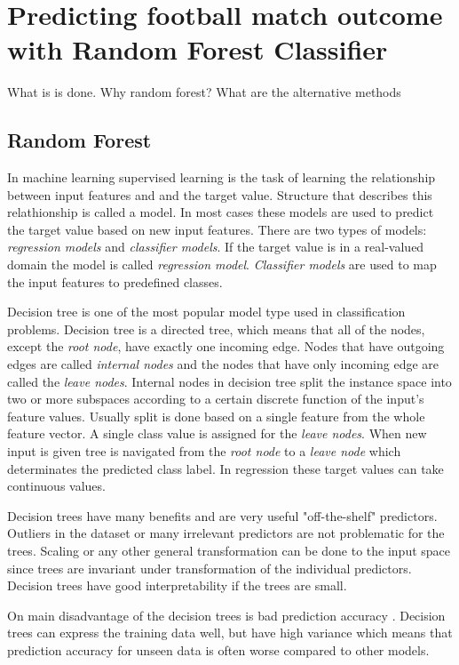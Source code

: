 \section{Predicting football match outcome with Random Forest Classifier}
What is is done. Why random forest? What are the alternative methods
\subsection{Random Forest}
In machine learning supervised learning is the task of learning the relationship between input features and and the target value. Structure that describes this relathionship is called a model. In most cases these models are used to predict the target value based on new input features. There are two types of models: \textit{regression models} and \textit{classifier models}. If the target value is in a real-valued domain the model is called \textit{regression model}. \textit{Classifier models} are used to map the input features to predefined classes. \cite{rokach2005top}

Decision tree is one of the most popular model type used in classification problems. Decision tree is a directed tree, which means that all of the nodes, except the \textit{root node}, have exactly one incoming edge. Nodes that have outgoing edges are called \textit{internal nodes} and the nodes that have only incoming edge are called the \textit{leave nodes}. Internal nodes in decision tree split the instance space into two or more subspaces according to a certain discrete function of the input's feature values. Usually split is done based on a single feature from the whole feature vector. A single class value is assigned for the \textit{leave nodes}. When new input is given tree is navigated from the \textit{root node} to a \textit{leave node} which determinates the predicted class label. In regression these target values can take continuous values. \cite{rokach2005top}

Decision trees have many benefits and are very useful "off-the-shelf" predictors. Outliers in the dataset or many irrelevant predictors are not problematic for the trees. Scaling or any other general transformation can be done to the input space since trees are invariant under transformation of the individual predictors. \cite{friedman2001elements} Decision trees have good interpretability if the trees are small.

On main disadvantage of the decision trees is bad prediction accuracy \cite{friedman2001elements}. Decision trees can express the training data well, but have high variance which means that prediction accuracy for unseen data is often worse compared to other models.

